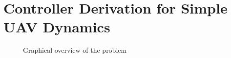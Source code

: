\section{Controller Derivation for Simple UAV Dynamics}
\begin{figure}[thpb]
	\centering
	\caption{Graphical overview of the problem}
	\label{overview}
\end{figure}

